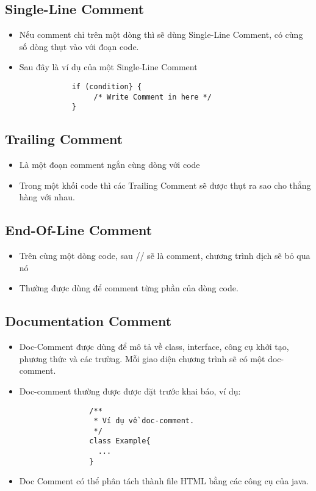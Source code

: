 \documentclass[a4paper]{report}
\begin{document}
	\subsection{Single-Line Comment}
	\begin{itemize}
		\item Nếu comment chỉ trên một dòng thì sẽ dùng Single-Line Comment, có cùng số dòng 
			  thụt vào với đoạn code.
		\item Sau đây là ví dụ của một Single-Line Comment
		\begin{verbatim}
			if (condition} {
			     /* Write Comment in here */
			}
		\end{verbatim}
	\end{itemize}
	\subsection{Trailing Comment}
	\begin{itemize}
		\item Là một đoạn comment ngắn cùng dòng với code
		\item Trong một khối code thì các Trailing Comment sẽ được thụt ra sao cho thẳng hàng 
			  với nhau.
	\end{itemize}
	\subsection{End-Of-Line Comment}
	\begin{itemize}
		\item Trên cùng một dòng code, sau // sẽ là comment, chương trình dịch sẽ bỏ qua nó
		\item Thường được dùng để comment từng phần của dòng code.
	\end{itemize}
	\subsection{Documentation Comment}
	\begin{itemize}
		\item Doc-Comment được dùng để mô tả về class, interface, công cụ khởi tạo, phương 
		thức và các trường. Mỗi giao diện chương trình sẽ có một doc-comment.
		\item Doc-comment thường được được đặt trước khai báo, ví dụ:
		\begin{verbatim}
			    /**
			     * Ví dụ về doc-comment.
			     */
			    class Example{
			      ...
			    }
		\end{verbatim}
		\item Doc Comment có thể phân tách thành file HTML bằng các công cụ của java.
	\end{itemize}
\end{document}
